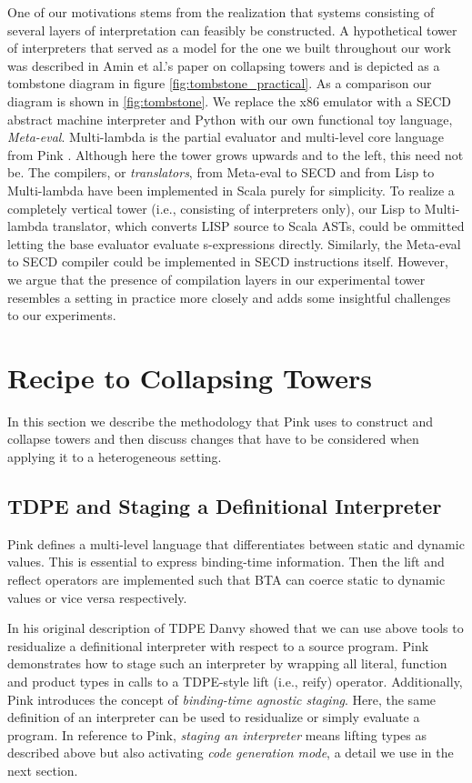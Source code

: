 \documentclass[a4paper,12pt,twoside,openright]{report}
\theoremstyle{definition}
\begin{document}
One of our motivations stems from the realization that systems consisting of several layers of interpretation can feasibly be constructed. A hypothetical tower of interpreters that served as a model for the one we built throughout our work was described in Amin et al.'s paper on collapsing towers \cite{amin2017collapsing} and is depicted as a tombstone diagram in figure \ref{fig:tombstone_practical}. As a comparison our diagram is shown in \ref{fig:tombstone}. We replace the x86 emulator with a SECD abstract machine interpreter and Python with our own functional toy language, \textit{Meta-eval}. Multi-lambda is the partial evaluator and multi-level core language from Pink \cite{amin2017collapsing}. Although here the tower grows upwards and to the left, this need not be. The compilers, or \textit{translators}, from Meta-eval to SECD and from Lisp to Multi-lambda have been implemented in Scala purely for simplicity. To realize a completely vertical tower (i.e., consisting of interpreters only), our Lisp to Multi-lambda translator, which converts LISP source to Scala ASTs, could be ommitted letting the base evaluator evaluate s-expressions directly. Similarly, the Meta-eval to SECD compiler could be implemented in SECD instructions itself. However, we argue that the presence of compilation layers in our experimental tower resembles a setting in practice more closely and adds some insightful challenges to our experiments.

\section{Recipe to Collapsing Towers}
In this section we describe the methodology that Pink uses to construct and collapse towers and then discuss changes that have to be considered when applying it to a heterogeneous setting.

\subsection{TDPE and Staging a Definitional Interpreter}\label{subsec:stage_def_interp}
Pink defines a multi-level language that differentiates between static and dynamic values. This is essential to express binding-time information. Then the lift and reflect operators are implemented such that BTA can coerce static to dynamic values or vice versa respectively.

In his original description of TDPE  Danvy \cite{danvy1999type} showed that we can use above tools to residualize a definitional interpreter with respect to a source program. Pink demonstrates how to stage such an interpreter by wrapping all literal, function and product types in calls to a TDPE-style lift (i.e., reify) operator. Additionally, Pink introduces the concept of \textit{binding-time agnostic staging}. Here, the same definition of an interpreter can be used to residualize or simply evaluate a program. In reference to Pink, \textit{staging an interpreter} means lifting types as described above but also activating \textit{code generation mode}, a detail we use in the next section.
\end{document}
